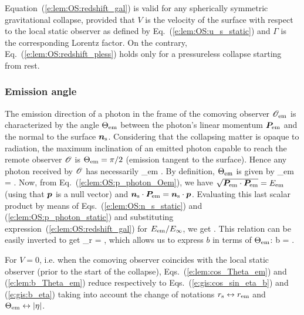 \begin{remark}
Equation~(\ref{e:lem:OS:redshift_gal}) is valid for any spherically symmetric
gravitational collapse, provided that $V$ is the velocity of the surface
with respect to the local static observer as defined by Eq.~(\ref{e:lem:OS:u_s_static})
and $\Gamma$ is the corresponding Lorentz factor. On the contrary,
Eq.~(\ref{e:lem:OS:redshift_pless}) holds only for a pressureless collapse
starting from rest.
\end{remark}

\subsubsection{Emission angle}

The emission direction of a photon in the frame of the comoving observer $\mathscr{O}_{\rm em}$
is characterized by the angle $\Theta_{\rm em}$ between the photon's linear momentum $\bm{P}_{\rm em}$
and the normal to the surface $\bm{n}_{\rm s}$. Considering that the collapsing matter
is opaque to radiation, the maximum inclination of an emitted photon capable to
reach the remote observer $\mathscr{O}$ is
$\Theta_{\rm em} = \pi/2$ (emission tangent to the surface).
Hence any photon received by $\mathscr{O}$ has necessarily
 \leq \Theta_{\rm em} \leq {} .
\ee
By definition, $\Theta_{\rm em}$ is given by
\be
    \cos\Theta_{\rm em} =
     .
\ee
Now, from Eq.~(\ref{e:lem:OS:p_photon_Oem}), we have
$\sqrt{\bm{P}_{\rm em}\cdot\bm{P}_{\rm em}} = E_{\rm em}$ (using that $\bm{p}$ is a null vector)
and $\bm{n}_{\rm s}\cdot\bm{P}_{\rm em} = \bm{n}_{\rm s}\cdot\bm{p}$. Evaluating this
last scalar product by means of Eqs.~(\ref{e:lem:OS:n_s_static}) and
(\ref{e:lem:OS:p_photon_static}) and substituting expression~(\ref{e:lem:OS:redshift_gal}) for
${E_{\rm em}}/{E_\infty}$, we get
\be \label{e:lem:cos_Theta_em}
    .
\ee
This relation can be easily inverted to get
\be \label{e:lem:sqrt_b2_cos_Th}
    \epsilon_r  =  ,
\ee
which allows us to express $b$ in terms of $\Theta_{\rm em}$:
\be \label{e:lem:b_Theta_em}
    b =  .
\ee
\begin{remark}
For $V=0$, i.e. when the comoving observer coincides with the local static observer (prior to the
start of the collapse), Eqs.~(\ref{e:lem:cos_Theta_em}) and (\ref{e:lem:b_Theta_em})
reduce respectively to Eqs.~(\ref{e:gis:cos_sin_eta_b}) and (\ref{e:gis:b_eta})
taking into account the change of notations $r_{\rm s}\leftrightarrow r_{\rm em}$ and
$\Theta_{\rm em} \leftrightarrow |\eta|$.
\end{remark}
